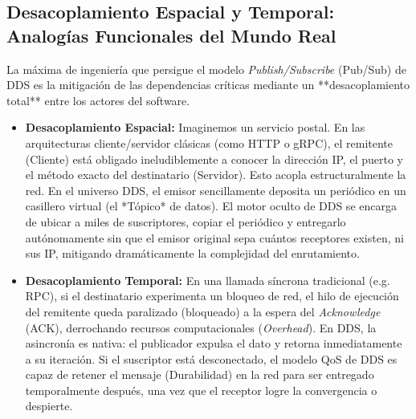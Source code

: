 \documentclass[11pt,a4paper,oneside]{report}
\begin{document}
\subsection{Desacoplamiento Espacial y Temporal: Analog\'ias Funcionales del Mundo Real}
La m\'axima de ingenier\'ia que persigue el modelo \textit{Publish/Subscribe} (Pub/Sub) de DDS es la mitigaci\'on de las dependencias cr\'iticas mediante un **desacoplamiento total** entre los actores del software.

\begin{itemize}
    \item \textbf{Desacoplamiento Espacial:} Imaginemos un servicio postal. En las arquitecturas cliente/servidor cl\'asicas (como HTTP o gRPC), el remitente (Cliente) est\'a obligado ineludiblemente a conocer la direcci\'on IP, el puerto y el m\'etodo exacto del destinatario (Servidor). Esto acopla estructuralmente la red. En el universo DDS, el emisor sencillamente deposita un peri\'odico en un casillero virtual (el *T\'opico* de datos). El motor oculto de DDS se encarga de ubicar a miles de suscriptores, copiar el peri\'odico y entregarlo aut\'onomamente sin que el emisor original sepa cu\'antos receptores existen, ni sus IP, mitigando dram\'aticamente la complejidad del enrutamiento.
    \item \textbf{Desacoplamiento Temporal:} En una llamada s\'incrona tradicional (e.g. RPC), si el destinatario experimenta un bloqueo de red, el hilo de ejecuci\'on del remitente queda paralizado (bloqueado) a la espera del \textit{Acknowledge} (ACK), derrochando recursos computacionales (\textit{Overhead}). En DDS, la asincron\'ia es nativa: el publicador expulsa el dato y retorna inmediatamente a su iteraci\'on. Si el suscriptor est\'a desconectado, el modelo QoS de DDS es capaz de retener el mensaje (Durabilidad) en la red para ser entregado temporalmente despu\'es, una vez que el receptor logre la convergencia o despierte.
\end{itemize}
\end{document}
